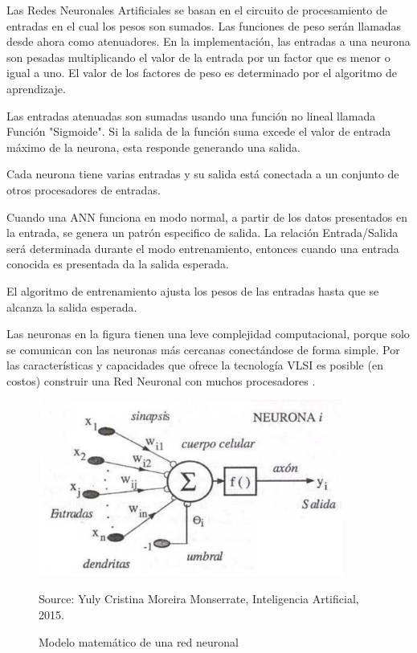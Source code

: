 Las Redes Neuronales Artificiales se basan en el circuito de procesamiento de
entradas en el cual los pesos son sumados. Las funciones de peso serán llamadas desde
ahora como atenuadores. En la implementación, las entradas a una neurona son pesadas
multiplicando el valor de la entrada por un factor que es menor o igual a uno. El valor de
los factores de peso es determinado por el algoritmo de aprendizaje.

Las entradas atenuadas son sumadas usando una función no lineal llamada
Función "Sigmoide". Si la salida de la función suma excede el valor de entrada máximo
de la neurona, esta responde generando una salida.

Cada neurona tiene varias entradas y su salida está conectada a un conjunto de
otros procesadores de entradas.

Cuando una ANN funciona en modo normal, a partir de los datos presentados en
la entrada, se genera un patrón especifico de salida. La relación Entrada/Salida será
determinada durante el modo entrenamiento, entonces cuando una entrada conocida es
presentada da la salida esperada.

El algoritmo de entrenamiento ajusta los pesos de las entradas hasta que se alcanza
la salida esperada.

Las neuronas en la figura tienen una leve complejidad computacional, porque solo
se comunican con las neuronas más cercanas conectándose de forma simple. Por las
características y capacidades que ofrece la tecnología VLSI es posible (en costos)
construir una Red Neuronal con muchos procesadores \cite{21RedesNeuronales}.


\begin{figure}[H]
		\centering
		\includegraphics[width=100mm]{./Imagenes/neurona_artificial.png}
		\caption{Modelo matemático de una red neuronal}
		Source: Yuly Cristina Moreira Monserrate, Inteligencia Artificial, 2015.
		\label{fig:neurona_artificial}
\end{figure}

